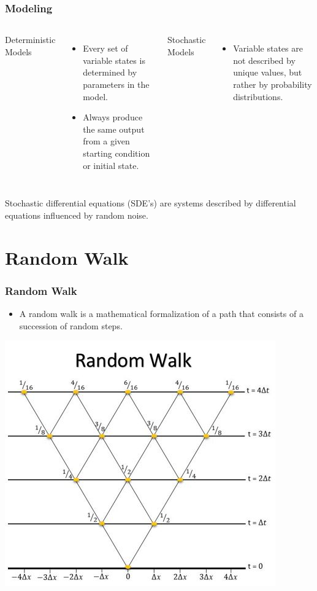 \begin{frame}
\frametitle{Modeling}
\begin{columns}[t]
Deterministic Models
\begin{itemize}
\item Every set of variable states is determined by parameters in the model.
\item Always produce the same output from a given starting condition or initial state.
\end{itemize}

Stochastic Models
\begin{itemize}
\item Variable states are not described by unique values, but rather by probability distributions.
\end{itemize}
\end{columns}

\bigskip
\centering
 Stochastic differential equations (SDE’s) are systems described by differential equations influenced by random noise.
\end{frame}

\section{Random Walk}
\begin{frame}
  \frametitle{Random Walk}
  \begin{itemize}
  \item A random walk is a mathematical formalization of a path that consists of a succession of random steps.
  \end{itemize}
  \centering
  \includegraphics[scale=0.67]{RandomWalk}
\end{frame}